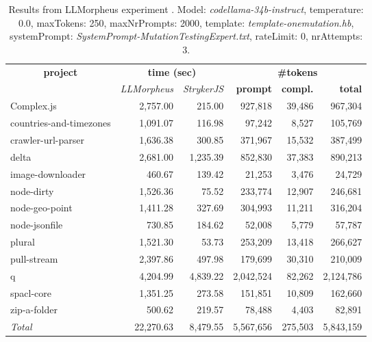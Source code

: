 
\begin{table*}[hbt!]
\centering
{\scriptsize
\begin{tabular}{l||r|r|r|r|r}
\multicolumn{1}{c|}{\bf project} & \multicolumn{2}{|c|}{\bf time (sec)} & \multicolumn{3}{|c|}{\bf \#tokens} \\
               & {\it LLMorpheus} & {\it StrykerJS} & {\bf prompt} & {\bf compl.} & {\bf total} \\
\hline
  Complex.js & 2,757.00 & 215.00 & 927,818 & 39,486 & 967,304 \\ 
countries-and-timezones & 1,091.07 & 116.98 & 97,242 & 8,527 & 105,769 \\ 
crawler-url-parser & 1,636.38 & 300.85 & 371,967 & 15,532 & 387,499 \\ 
delta & 2,681.00 & 1,235.39 & 852,830 & 37,383 & 890,213 \\ 
image-downloader & 460.67 & 139.42 & 21,253 & 3,476 & 24,729 \\ 
node-dirty & 1,526.36 & 75.52 & 233,774 & 12,907 & 246,681 \\ 
node-geo-point & 1,411.28 & 327.69 & 304,993 & 11,211 & 316,204 \\ 
node-jsonfile & 730.85 & 184.62 & 52,008 & 5,779 & 57,787 \\ 
plural & 1,521.30 & 53.73 & 253,209 & 13,418 & 266,627 \\ 
pull-stream & 2,397.86 & 497.98 & 179,699 & 30,310 & 210,009 \\ 
q & 4,204.99 & 4,839.22 & 2,042,524 & 82,262 & 2,124,786 \\ 
spacl-core & 1,351.25 & 273.58 & 151,851 & 10,809 & 162,660 \\ 
zip-a-folder & 500.62 & 219.57 & 78,488 & 4,403 & 82,891 \\ 
\hline
  \textit{Total} & 22,270.63 & 8,479.55 & 5,567,656 & 275,503 & 5,843,159 \\
  \end{tabular}
  }
  \\[2mm]
  \caption{Results from LLMorpheus experiment .
    Model: \textit{codellama-34b-instruct}, 
    temperature: 0.0, 
    maxTokens: 250, 
    maxNrPrompts: 2000, 
    template: \textit{template-onemutation.hb}, 
    systemPrompt: \textit{SystemPrompt-MutationTestingExpert.txt}, 
    rateLimit: 0, 
    nrAttempts: 3.  
  }
  \label{table:Cost:run366:codellama-34b-instruct:template-onemutation.hb:0.0}
\end{table*}